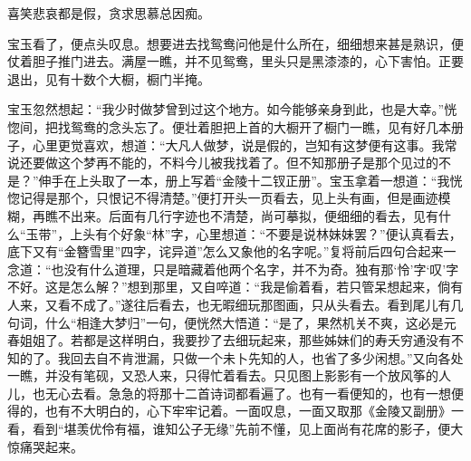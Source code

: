 \begin{poem}
    \begin{pl}
        喜笑悲哀都是假，贪求思慕总因痴。
    \end{pl}
\end{poem}


\begin{parag}
    宝玉看了，便点头叹息。想要进去找鸳鸯问他是什么所在，细细想来甚是熟识，便仗着胆子推门进去。满屋一瞧，并不见鸳鸯，里头只是黑漆漆的，心下害怕。正要退出，见有十数个大橱，橱门半掩。
\end{parag}


\begin{parag}
    宝玉忽然想起：“我少时做梦曾到过这个地方。如今能够亲身到此，也是大幸。”恍惚间，把找鸳鸯的念头忘了。便壮着胆把上首的大橱开了橱门一瞧，见有好几本册子，心里更觉喜欢，想道：“大凡人做梦，说是假的，岂知有这梦便有这事。我常说还要做这个梦再不能的，不料今儿被我找着了。但不知那册子是那个见过的不是？”伸手在上头取了一本，册上写着“金陵十二钗正册”。宝玉拿着一想道：“我恍惚记得是那个，只恨记不得清楚。”便打开头一页看去，见上头有画，但是画迹模糊，再瞧不出来。后面有几行字迹也不清楚，尚可摹拟，便细细的看去，见有什么“玉带”，上头有个好象“林”字，心里想道：“不要是说林妹妹罢？”便认真看去，底下又有“金簪雪里”四字，诧异道”怎么又象他的名字呢。”复将前后四句合起来一念道：“也没有什么道理，只是暗藏着他两个名字，并不为奇。独有那‘怜’字‘叹’字不好。这是怎么解？”想到那里，又自啐道：“我是偷着看，若只管呆想起来，倘有人来，又看不成了。”遂往后看去，也无暇细玩那图画，只从头看去。看到尾儿有几句词，什么“相逢大梦归”一句，便恍然大悟道：“是了，果然机关不爽，这必是元春姐姐了。若都是这样明白，我要抄了去细玩起来，那些姊妹们的寿夭穷通没有不知的了。我回去自不肯泄漏，只做一个未卜先知的人，也省了多少闲想。”又向各处一瞧，并没有笔砚，又恐人来，只得忙着看去。只见图上影影有一个放风筝的人儿，也无心去看。急急的将那十二首诗词都看遍了。也有一看便知的，也有一想便得的，也有不大明白的，心下牢牢记着。一面叹息，一面又取那《金陵又副册》一看，看到“堪羡优伶有福，谁知公子无缘”先前不懂，见上面尚有花席的影子，便大惊痛哭起来。
\end{parag}


